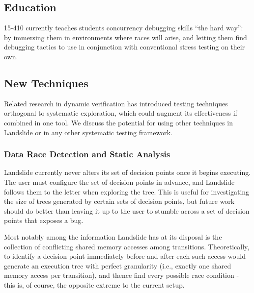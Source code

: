 \subsection{Education}
\label{sec:future-education}

15-410 currently teaches students concurrency debugging skills ``the hard way'': by immersing them in environments where races will arise, and letting them find debugging tactics to use in conjunction with conventional stress testing on their own.

\subsection{New Techniques}
\label{sec:future-new}

Related research in dynamic verification has introduced testing techniques orthogonal to systematic exploration, which could augment its effectiveness if combined in one tool. We discuss the potential for using other techniques in Landslide or in any other systematic testing framework.

\subsubsection{Data Race Detection and Static Analysis}

Landslide currently never alters its set of decision points once it begins executing. The user must configure the set of decision points in advance, and Landslide follows them to the letter when exploring the tree. This is useful for investigating the size of trees generated by certain sets of decision points, but future work should do better than leaving it up to the user to stumble across a set of decision points that exposes a bug.

Most notably among the information Landslide has at its disposal is the collection of conflicting shared memory accesses among transitions. Theoretically, to identify a decision point immediately before and after each such access would generate an execution tree with perfect granularity (i.e., exactly one shared memory access per transition), and thence find every possible race condition - this is, of course, the opposite extreme to the current setup.

